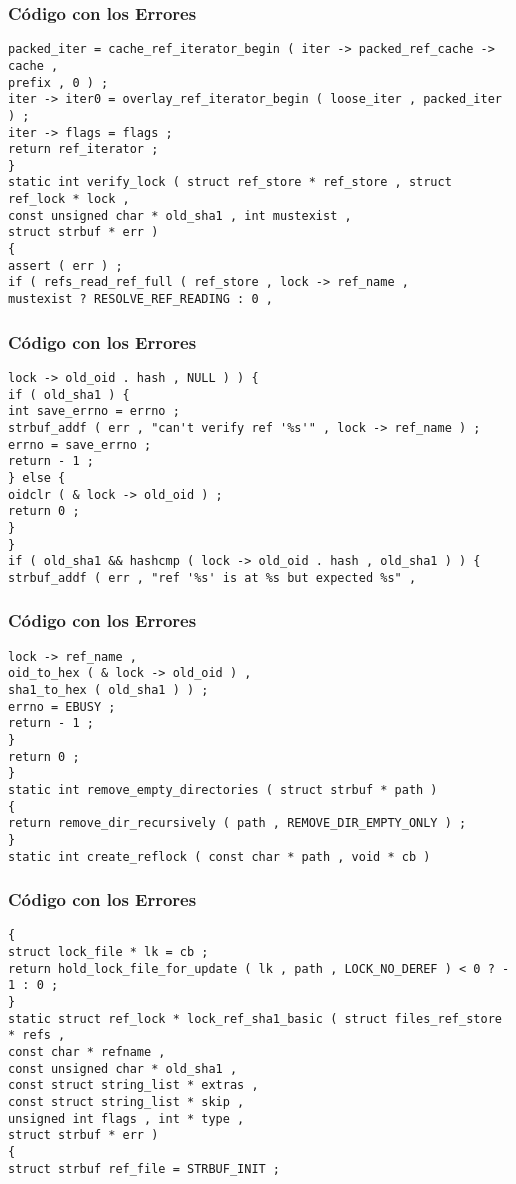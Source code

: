 \documentclass{beamer}
\begin{document}
\begin{frame}[fragile]
\frametitle{C\'odigo con los Errores}
\begin{verbatim}
packed_iter = cache_ref_iterator_begin ( iter -> packed_ref_cache -> cache , 
prefix , 0 ) ; 
iter -> iter0 = overlay_ref_iterator_begin ( loose_iter , packed_iter ) ; 
iter -> flags = flags ; 
return ref_iterator ; 
} 
static int verify_lock ( struct ref_store * ref_store , struct ref_lock * lock , 
const unsigned char * old_sha1 , int mustexist , 
struct strbuf * err ) 
{ 
assert ( err ) ; 
if ( refs_read_ref_full ( ref_store , lock -> ref_name , 
mustexist ? RESOLVE_REF_READING : 0 , 
\end{verbatim}
\end{frame}
\begin{frame}[fragile]
\frametitle{C\'odigo con los Errores}
\begin{verbatim}
lock -> old_oid . hash , NULL ) ) { 
if ( old_sha1 ) { 
int save_errno = errno ; 
strbuf_addf ( err , "can't verify ref '%s'" , lock -> ref_name ) ; 
errno = save_errno ; 
return - 1 ; 
} else { 
oidclr ( & lock -> old_oid ) ; 
return 0 ; 
} 
} 
if ( old_sha1 && hashcmp ( lock -> old_oid . hash , old_sha1 ) ) { 
strbuf_addf ( err , "ref '%s' is at %s but expected %s" , 
\end{verbatim}
\end{frame}
\begin{frame}[fragile]
\frametitle{C\'odigo con los Errores}
\begin{verbatim}
lock -> ref_name , 
oid_to_hex ( & lock -> old_oid ) , 
sha1_to_hex ( old_sha1 ) ) ; 
errno = EBUSY ; 
return - 1 ; 
} 
return 0 ; 
} 
static int remove_empty_directories ( struct strbuf * path ) 
{ 
return remove_dir_recursively ( path , REMOVE_DIR_EMPTY_ONLY ) ; 
} 
static int create_reflock ( const char * path , void * cb ) 
\end{verbatim}
\end{frame}
\begin{frame}[fragile]
\frametitle{C\'odigo con los Errores}
\begin{verbatim}
{ 
struct lock_file * lk = cb ; 
return hold_lock_file_for_update ( lk , path , LOCK_NO_DEREF ) < 0 ? - 1 : 0 ; 
} 
static struct ref_lock * lock_ref_sha1_basic ( struct files_ref_store * refs , 
const char * refname , 
const unsigned char * old_sha1 , 
const struct string_list * extras , 
const struct string_list * skip , 
unsigned int flags , int * type , 
struct strbuf * err ) 
{ 
struct strbuf ref_file = STRBUF_INIT ; 
\end{verbatim}
\end{frame}
\end{document}
